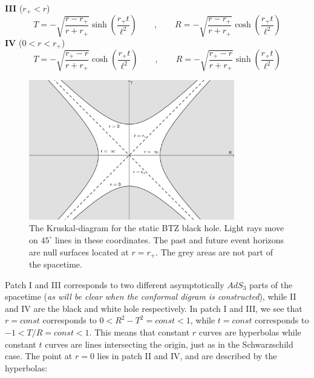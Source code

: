 %
%
\textbf{III} \qquad ($r_+ < r$)
%
\begin{equation}
T = - \sqrt{\frac{r - r_+}{r + r_+}} \sinh \left( \frac{r_+ t}{\ell^2}\right)
\qquad , \qquad
R = - \sqrt{\frac{r - r_+}{r + r_+}} \cosh \left( \frac{r_+ t}{\ell^2}\right)
\end{equation}
%
%
\textbf{IV} \qquad ($0 < r < r_+$)
%
\begin{equation}
T = - \sqrt{\frac{r_+ - r}{r + r_+}} \cosh \left( \frac{r_+ t}{\ell^2}\right)
\qquad , \qquad
R = - \sqrt{\frac{r_+ - r}{r + r_+}} \sinh \left( \frac{r_+ t}{\ell^2}\right)
\end{equation}\newline
%
%
\begin{figure}[h!]
%
\centering
%
\includegraphics[width=0.80\textwidth]{../pics/Kruskal_static.png}
%
\caption{The Kruskal-diagram for the static BTZ black hole. Light rays move on $45^{\circ}$ lines in these coordinates. The past and future event horizons are null surfaces located at $r=r_+$. The grey areas are not part of the spacetime.}
%
\label{fig:kruskal_static}
%
\end{figure}\newline \noindent
%
%
Patch I and III corresponds to two different asymptotically $AdS_3$ parts of the spacetime (\textit{as will be clear when the conformal digram is constructed}), while II and IV are the black and white hole respectively. In patch I and III, we see that $r = const$ corresponds to $0 < R^2 - T^2 = const < 1$, while $t = const$ corresponds to $-1 < T / R = const < 1$. This means that constant $r$ curves are hyperbolas while constant $t$ curves are lines intersecting the origin, just as in the Schwarzschild case. The point at $r = 0$ lies in patch II and IV, and are described by the hyperbolas:
%
%
